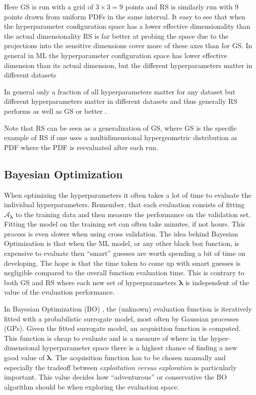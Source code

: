 \documentclass[a4paper, twoside, nobib]{tufte-book}
\newcommand{\q}[1]{``#1''}
\newcommand{\autocite}[1]{\citep{#1}}
\begin{document}
Here GS is run with a grid of $3\times3 = 9$ points and RS is similarly run with 9 points drawn from uniform PDFs in the same interval. It easy to see that when the hyperparameter configuration space has a lower effective dimensionality than the actual dimensionality RS is far better at probing the space due to the projections into the sensitive dimensions cover more of these axes than for GS. In general in ML the hyperparameter configuration space has lower effective dimension than its actual dimension, but the different hyperparameters matter in different datasets

In general only a fraction of all hyperparameters matter for any dataset but different hyperparameters matter in different datasets and thus generally RS performs as well as GS or better \autocite{bergstraRandomSearchHyperparameter2012}. 

Note that RS can be seen as a generalization of GS, where GS is the specific example of RS if one uses a multidimensional hypergeometric distribution as PDF where the PDF is reevaluated after each run. 

\subsection{Bayesian Optimization}
\label{subsec:ml:bayesian_optimization}
When optimizing the hyperparameters it often takes a lot of time to evaluate the individual hyperparameters. Remember, that each evaluation consists of fitting $\mathcal{A}_{\bm{\lambda}}$ to the training data and then measure the performance on the validation set. Fitting the model on the training set can often take minutes, if not hours. This process is even slower when using cross validation. The idea behind Bayesian Optimization is that when the ML model, or any other black box function, is expensive to evaluate then \q{smart} guesses are worth spending a bit of time on developing. The hope is that the time taken to come up with smart guesses is negligible compared to the overall function evaluation time. This is contrary to both GS and RS where each new set of hyperparameters $\bm{\lambda}$ is independent of the value of the evaluation performance.

In Bayesian Optimization (BO) \autocite{brochuTutorialBayesianOptimization2010}, the (unknown) evaluation function is iteratively fitted with a probabilistic surrogate model, most often by Gaussian processes (GPs). Given the fitted surrogate model, an acquisition function is computed. This function is cheap to evaluate and is a measure of where in the hyper-dimensional hyperparameter space there is a highest chance of finding a new good value of $\bm{\lambda}$. The acquisition function has to be chosen manually and especially the tradeoff between \emph{exploitation versus exploration} is particularly important. This value decides how \q{adventurous} or conservative the BO algorithm should be when exploring the evaluation space. 
\end{document}
